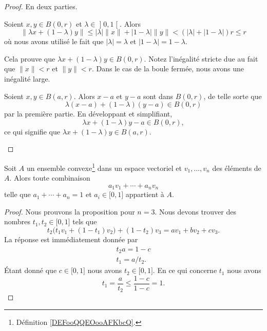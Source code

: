 \begin{proof}
	En deux parties.
	\begin{subproof}
		Soient \( x,y\in B(0,r)\) et \( \lambda\in\mathopen] 0 , 1 \mathclose[\). Alors
		\begin{equation}
			\| \lambda x+(1-\lambda)y \|\leq | \lambda |\| x \|+| 1-\lambda |\| y \|< (| \lambda | +| 1-\lambda |)r\leq r
		\end{equation}
		où nous avons utilisé le fait que \( | \lambda |=\lambda\) et \( | 1-\lambda |=1-\lambda\).

		Cela prouve que \( \lambda x+(1-\lambda)y\in B(0,r)\). Notez l'inégalité stricte due au fait que \( \| x \|<r\) et \( \| y \|<r\). Dans le cas de la boule fermée, nous avons une inégalité large.


		Soient \( x,y\in B(a,r)\). Alors \( x-a\) et \( y-a\) sont dans \( B(0,r)\), de telle sorte que
		\begin{equation}
			\lambda(x-a)+(1-\lambda)(y-a)\in B(0,r)
		\end{equation}
		par la première partie. En développant et simplifiant,
		\begin{equation}
			\lambda x+(1-\lambda)y-a\in B(0,r),
		\end{equation}
		ce qui signifie que \( \lambda x+(1-\lambda)y\in B(a,r)\).
	\end{subproof}
\end{proof}

\begin{proposition}     \label{PropPoNpPz}
	Soit \( A\) un ensemble convexe\footnote{Définition \ref{DEFooQQEOooAFKbcQ}.} dans un espace vectoriel et \( v_1,\ldots, v_n\) des éléments de \( A\). Alors toute combinaison
	\begin{equation}
		a_1v_1+\cdots +a_nv_n
	\end{equation}
	telle que \( a_1+\cdots +a_n=1\) et \( a_i\in\mathopen[ 0 , 1 \mathclose]\) appartient à \( A\).
\end{proposition}

\begin{proof}
	Nous prouvons la proposition pour \( n=3\). Nous devons trouver des nombres \( t_1,t_2\in \mathopen[ 0 , 1 \mathclose]\) tels que
	\begin{equation}
		t_2\big( t_1v_1+(1-t_1)v_2 \big)+(1-t_2)v_3=av_1+bv_2+cv_3.
	\end{equation}
	La réponse est immédiatement donnée par
	\begin{subequations}
		\begin{align}
			t_2a=1-c \\
			t_1=a/t_2.
		\end{align}
	\end{subequations}
	Étant donné que \( c\in \mathopen[ 0 , 1 \mathclose]\) nous avons \( t_2\in\mathopen[ 0 , 1 \mathclose]\). En ce qui concerne \( t_1\) nous avons
	\begin{equation}
		t_1=\frac{ a }{ t_2 }\leq \frac{ 1-c }{ 1-c }=1.
	\end{equation}
\end{proof}

